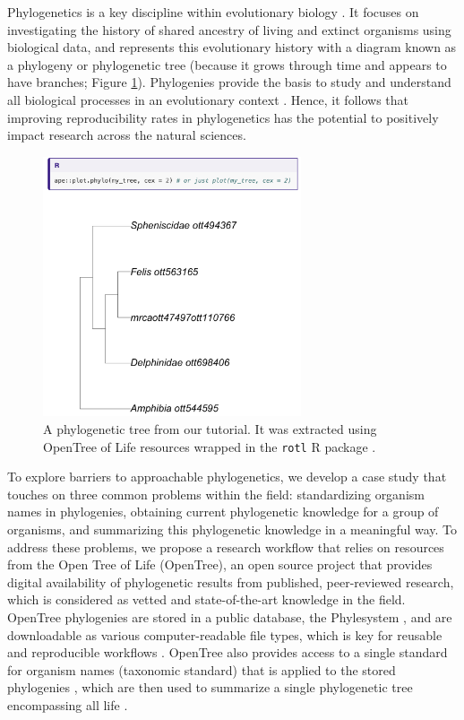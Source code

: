 \documentclass[12pt]{article}
\begin{document}
Phylogenetics is a key discipline within evolutionary biology \citep{dobzhansky1973nothing}.
It focuses on investigating the history of shared ancestry of living and extinct organisms using biological data, and represents this evolutionary history with a diagram known as a phylogeny or phylogenetic tree (because it grows through time and appears to have branches; Figure \ref{fig:tree}).
Phylogenies provide the basis to study and understand all biological processes in an evolutionary context \citep{dobzhansky1973nothing}.
Hence, it follows that improving reproducibility rates in phylogenetics has the potential to positively impact research across the natural sciences.

\begin{figure}
\begin{center}
\includegraphics[width=3in]{fig_tree.png}
\end{center}
\caption{A phylogenetic tree from our tutorial. It was extracted using OpenTree of Life resources \citep{opentreeoflife2019synth} wrapped in the \texttt{rotl} R package \citep{michonneau2016rotl}. \label{fig:tree}}
\end{figure}

To explore barriers to approachable phylogenetics, we develop a case study that touches on three common problems within the field: standardizing organism names in phylogenies, obtaining current phylogenetic knowledge for a group of organisms, and summarizing this phylogenetic knowledge in a meaningful way.
To address these problems, we propose a research workflow that relies on resources from the Open Tree of Life (OpenTree), an open source project that provides digital availability of phylogenetic results from published, peer-reviewed research, which is considered as vetted and state-of-the-art knowledge in the field.
OpenTree phylogenies are stored in a public database, the Phylesystem \citep{mctavish2015phylesystem}, and are downloadable as various computer-readable file types, which is key for reusable and reproducible workflows \citep{wilson2017good}.
OpenTree also provides access to a single standard for organism names (taxonomic standard) that is applied to the stored phylogenies \citep{rees2017automated}, which are then used to summarize a single phylogenetic tree encompassing all life \citep{opentreeoflife2019synth}.
\end{document}
